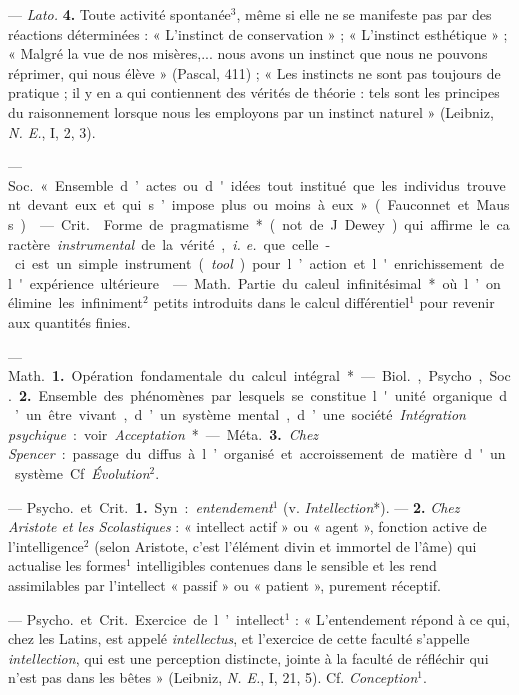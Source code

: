 \begin{itemize}[leftmargin=1cm, label=, itemsep=1pt]
— {\it Lato.} {\bf 4.} Toute activité spontanée$^3$, même si elle ne se
manifeste pas par des réactions déterminées : « L'instinct de
conservation » ; « L'instinct esthétique » ; « Malgré la vue de nos
misères,... nous avons un instinct que nous ne pouvons réprimer, qui nous
élève » (Pascal, 411) ; « Les instincts ne sont pas toujours de pratique ; il
y en a qui contiennent des vérités de théorie : tels sont les principes du
raisonnement lorsque nous les employons par un instinct naturel » (Leibniz,
{\it N. E.}, I, 2, 3).

 — \si{Soc.} « Ensemble d’actes ou d'idées tout institué que
les individus trouvent devant eux et qui s’impose plus ou moins à
eux » (Fauconnet et Mauss).

 — \si{Crit.}  Forme de pragmatisme* (not.
de J. Dewey) qui affirme le caractère {\it instrumental} de la vérité,
{\it i. e.} que celle-ci est un simple instrument ({\it tool}) pour l’action
et l'enrichissement de l'expérience ultérieure.

 — \si{Math.} Partie du caleul infinitésimal* où l’on
élimine
les infiniment$^2$ petits introduits dans le calcul différentiel$^1$ pour
revenir aux quantités finies.

 — \si{Math.} {\bf 1.} Opération fondamentale du calcul
intégral*. — \si{Biol.}, Psycho, \si{Soc.} {\bf 2.} Ensemble des phénomènes
par lesquels se constitue l'unité organique d’un être vivant, d’un système
mental, d’une société. {\it Intégration psychique} : voir {\it Acceptation}*.
— \si{Méta.} {\bf 3.} {\it Chez Spencer} : passage du diffus à l’organisé et
accroissement de matière d'un système. Cf. {\it Évolution}$^2$.

 — \si{Psycho.} et \si{Crit.} {\bf 1.} Syn. :
{\it entendement}$^1$ (v. {\it Intellection}*). —  {\bf 2.} {\it Chez Aristote
et les Scolastiques} : « intellect actif » ou « agent », fonction active de
l'intelligence$^2$ (selon Aristote, c’est l'élément divin et immortel de
l’âme) qui actualise les formes$^1$ intelligibles contenues dans le sensible
et les rend assimilables par l'intellect « passif » ou « patient », purement
réceptif.

 — \si{Psycho.} et \si{Crit.} Exercice de l’intellect$^1$ :
« L’entendement répond à ce qui, chez les Latins, est appelé
{\it intellectus}, et l'exercice de cette faculté s’appelle
{\it intellection}, qui est une perception distincte, jointe à la faculté de
réfléchir qui n’est pas dans les bêtes » (Leibniz, {\it N. E.}, I, 21, 5).
Cf. {\it Conception}$^1$.


\end{itemize}
